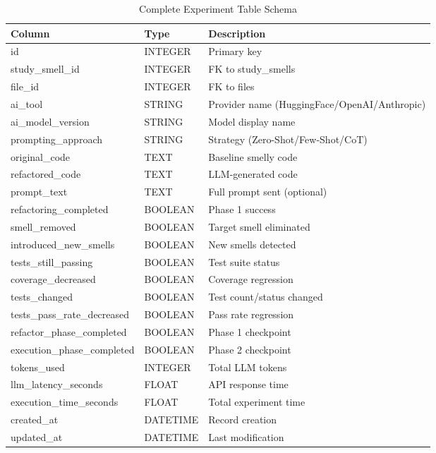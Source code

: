 \begin{table}[h]
\centering
\caption{Complete Experiment Table Schema}
\small
\begin{tabular}{@{}llp{5cm}@{}}
\toprule
\textbf{Column} & \textbf{Type} & \textbf{Description} \\ \midrule
id & INTEGER & Primary key \\
study\_smell\_id & INTEGER & FK to study\_smells \\
file\_id & INTEGER & FK to files \\
ai\_tool & STRING & Provider name (HuggingFace/OpenAI/Anthropic) \\
ai\_model\_version & STRING & Model display name \\
prompting\_approach & STRING & Strategy (Zero-Shot/Few-Shot/CoT) \\
original\_code & TEXT & Baseline smelly code \\
refactored\_code & TEXT & LLM-generated code \\
prompt\_text & TEXT & Full prompt sent (optional) \\
refactoring\_completed & BOOLEAN & Phase 1 success \\
smell\_removed & BOOLEAN & Target smell eliminated \\
introduced\_new\_smells & BOOLEAN & New smells detected \\
tests\_still\_passing & BOOLEAN & Test suite status \\
coverage\_decreased & BOOLEAN & Coverage regression \\
tests\_changed & BOOLEAN & Test count/status changed \\
tests\_pass\_rate\_decreased & BOOLEAN & Pass rate regression \\
refactor\_phase\_completed & BOOLEAN & Phase 1 checkpoint \\
execution\_phase\_completed & BOOLEAN & Phase 2 checkpoint \\
tokens\_used & INTEGER & Total LLM tokens \\
llm\_latency\_seconds & FLOAT & API response time \\
execution\_time\_seconds & FLOAT & Total experiment time \\
created\_at & DATETIME & Record creation \\
updated\_at & DATETIME & Last modification \\ \bottomrule
\end{tabular}
\end{table}

